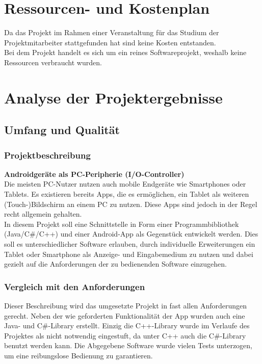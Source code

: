 \documentclass{scrartcl}
\begin{document}
\section{Ressourcen- und Kostenplan}
Da das Projekt im Rahmen einer Veranstaltung für das Studium der Projektmitarbeiter stattgefunden hat sind keine Kosten entstanden. \\
Bei dem Projekt handelt es sich um ein reines Softwareprojekt, weshalb keine Ressourcen verbraucht wurden. 

\section{Analyse der Projektergebnisse}

\subsection{Umfang und Qualität}
\subsubsection{Projektbeschreibung}

\textbf{Androidgeräte als PC-Peripherie (I/O-Controller)}\\
Die meisten PC-Nutzer nutzen auch mobile Endgeräte wie Smart­phones oder Tablets. Es existieren bereits Apps, die es ermöglichen, ein Tablet als weiteren (Touch-)Bildschirm an einem PC zu nutzen. Diese Apps sind jedoch in der Regel recht allgemein gehalten.\\
In diesem Projekt soll eine Schnittstelle in Form einer Programmbibliothek (Java/C\#/C++) und einer Android-App als Gegenstück entwickelt werden. Dies soll es unterschiedlicher Software erlauben, durch individuelle Erweiterungen ein Tablet oder Smartphone als Anzeige- und Eingabe­medium zu nutzen und dabei gezielt auf die Anforderungen der zu bedienenden Software einzugehen.\\
\subsubsection{Vergleich mit den Anforderungen}
Dieser Beschreibung wird das umgesetzte Projekt in fast allen Anforderungen gerecht. Neben der wie geforderten Funktionalität der App wurden auch eine Java- und C\#-Library erstellt. Einzig die C++-Library wurde im Verlaufe des Projektes als nicht notwendig eingestuft, da unter C++ auch die C\#-Library benutzt werden kann.
Die Abgegebene Software wurde vielen Tests unterzogen, um eine reibungslose Bedienung zu garantieren.
\end{document}
